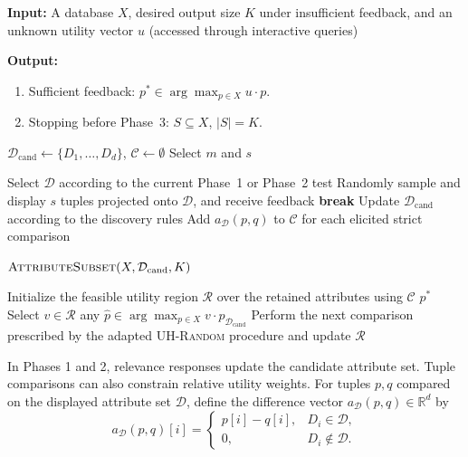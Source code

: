 \begin{algorithm}[!t]
\caption{Overall Framework}
\label{alg:overall}
\flushleft
\textbf{Input:} A database $X$, desired output size $K$ under insufficient feedback, and an unknown utility vector $u$ (accessed through interactive queries)

\textbf{Output:}
\begin{enumerate}[label=(\arabic*)]
\item Sufficient feedback: $p^*\in\arg\max_{p\in X}u\cdot p$.
\item Stopping before Phase~3: $S\subseteq X$, $\lvert S\rvert=K$.
\end{enumerate}

\begin{algorithmic}[1]
\State $\mathcal{D}_{\mathrm{cand}}\gets\{D_1,\ldots,D_d\}$, $\mathcal{C}\gets\emptyset$ 
\State Select $m$ and $s$ 

    \State Select $\mathcal{D}$ according to the current Phase~1 or Phase~2 test
    \State Randomly sample and display $s$ tuples projected onto $\mathcal{D}$, and receive feedback
        \State \textbf{break}
    \EndIf
    \State Update $\mathcal{D}_{\mathrm{cand}}$ according to the discovery rules
    \State Add $a_{\mathcal{D}}(p,q)$ to $\mathcal{C}$ for each elicited strict comparison
\EndWhile

    \State \Return $\textsc{AttributeSubset}(X,\mathcal{D}_{\mathrm{cand}},K)$
\EndIf

\State Initialize the feasible utility region $\mathcal{R}$ over the retained attributes using $\mathcal{C}$
\Repeat
        \State \Return $p^*$
    \EndIf
        \State Select $v\in\mathcal{R}$
        \State \Return any $\hat p\in\arg\max_{p\in X}v\cdot p_{\mathcal{D}_{\mathrm{cand}}}$
    \EndIf
    \State Perform the next comparison prescribed by the adapted \textsc{UH-Random} procedure and update $\mathcal{R}$
\end{algorithmic}
\end{algorithm}

In Phases 1 and 2, relevance responses update the candidate attribute set. Tuple comparisons can also constrain relative utility weights. For tuples $p,q$ compared on the displayed attribute set $\mathcal{D}$, define the difference vector $a_{\mathcal{D}}(p,q)\in\mathbb{R}^d$ by
\[
a_{\mathcal{D}}(p,q)[i]=
\begin{cases}
p[i]-q[i],&D_i\in\mathcal{D},\\
0,&D_i\notin\mathcal{D}.
\end{cases}
\]

